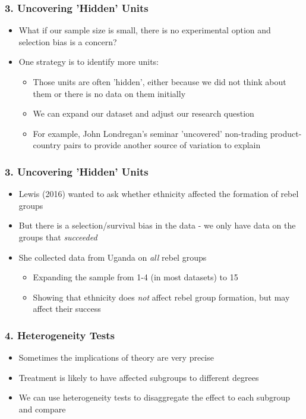 \documentclass[xcolor=x11names,compress]{beamer}\usepackage[]{graphicx}\usepackage[]{color}
\renewcommand{\(}{\begin{columns}}
\renewcommand{\)}{\end{columns}}
\newcommand{\<}[1]{\begin{column}{#1}}
\renewcommand{\>}{\end{column}}
\begin{document}
\begin{frame}
\frametitle{3. Uncovering 'Hidden' Units}
\begin{itemize}
\item What if our sample size is small, there is no experimental option and selection bias is a concern? 
\pause
\item One strategy is to identify more units:
\pause
\begin{itemize}
\item Those units are often 'hidden', either because we did not think about them or there is no data on them initially
\pause
\item We can expand our dataset and adjust our research question
\pause
\item For example, John Londregan's seminar 'uncovered' non-trading product-country pairs to provide another source of variation to explain
\end{itemize}
\end{itemize}
\end{frame}

\begin{frame}
\frametitle{3. Uncovering 'Hidden' Units}
\begin{itemize}
\item Lewis (2016) wanted to ask whether ethnicity affected the formation of rebel groups
\pause
\item But there is a selection/survival bias in the data - we only have data on the groups that \textit{succeeded}
\pause
\item She collected data from Uganda on \textit{all} rebel groups
\pause
\begin{itemize}
\item Expanding the sample from 1-4 (in most datasets) to 15
\pause
\item Showing that ethnicity does \textit{not} affect rebel group formation, but may affect their success
\end{itemize}
\end{itemize}
\end{frame}



\begin{frame}
\frametitle{4. Heterogeneity Tests}
\begin{itemize}
\item Sometimes the implications of theory are very precise
\pause
\item Treatment is likely to have affected subgroups to different degrees
\pause
\item We can use heterogeneity tests to disaggregate the effect to each subgroup and compare
\end{itemize}
\end{frame}
\end{document}
